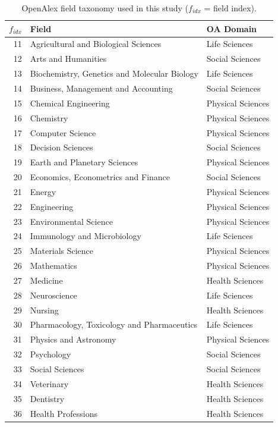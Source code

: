 \begin{table}[ht]
\centering
\small
\caption{OpenAlex field taxonomy used in this study ($f_{idx}$ = field index).}
\label{tab:fields}
\begin{tabular}{rll}
\toprule
$f_{idx}$ & Field & OA Domain \\
\midrule
11 & Agricultural and Biological Sciences   & Life Sciences \\
12 & Arts and Humanities                    & Social Sciences \\
13 & Biochemistry, Genetics and Molecular Biology & Life Sciences \\
14 & Business, Management and Accounting    & Social Sciences \\
15 & Chemical Engineering                   & Physical Sciences \\
16 & Chemistry                              & Physical Sciences \\
17 & Computer Science                       & Physical Sciences \\
18 & Decision Sciences                      & Social Sciences \\
19 & Earth and Planetary Sciences           & Physical Sciences \\
20 & Economics, Econometrics and Finance    & Social Sciences \\
21 & Energy                                 & Physical Sciences \\
22 & Engineering                            & Physical Sciences \\
23 & Environmental Science                  & Physical Sciences \\
24 & Immunology and Microbiology            & Life Sciences \\
25 & Materials Science                      & Physical Sciences \\
26 & Mathematics                            & Physical Sciences \\
27 & Medicine                               & Health Sciences \\
28 & Neuroscience                           & Life Sciences \\
29 & Nursing                                & Health Sciences \\
30 & Pharmacology, Toxicology and Pharmaceutics & Life Sciences \\
31 & Physics and Astronomy                  & Physical Sciences \\
32 & Psychology                             & Social Sciences \\
33 & Social Sciences                        & Social Sciences \\
34 & Veterinary                             & Health Sciences \\
35 & Dentistry                              & Health Sciences \\
36 & Health Professions                     & Health Sciences \\
\bottomrule
\end{tabular}
\end{table}

